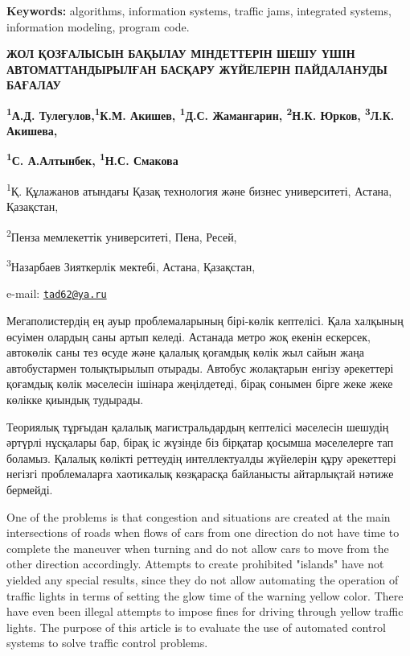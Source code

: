 {\bfseries Keywords:} algorithms, information systems, traffic jams,
integrated systems, information modeling, program code.

\begin{articleheader}
{\bfseries ЖОЛ ҚОЗҒАЛЫСЫН БАҚЫЛАУ МІНДЕТТЕРІН ШЕШУ ҮШІН АВТОМАТТАНДЫРЫЛҒАН
БАСҚАРУ ЖҮЙЕЛЕРІН ПАЙДАЛАНУДЫ БАҒАЛАУ}

{\bfseries \textsuperscript{1}А.Д.
Тулегулов\textsuperscript{\envelope },\textsuperscript{1}К.М. Акишев,
\textsuperscript{1}Д.С. Жамангарин, \textsuperscript{2}Н.К. Юрков,
\textsuperscript{3}Л.К. Акишева,}

{\bfseries \textsuperscript{1}С. А.Алтынбек, \textsuperscript{1}Н.С.
Смакова}
\end{articleheader}

\begin{affiliation}
\textsuperscript{1}Қ. Құлажанов атындағы Қазақ технология және бизнес
университеті, Астана, Қазақстан,

\textsuperscript{2}Пенза мемлекеттік университеті, Пена, Ресей,

\textsuperscript{3}Назарбаев Зияткерлік мектебі, Астана, Қазақстан,

e-mail: \href{mailto:tad62@ya.ru}{\nolinkurl{tad62@ya.ru}}
\end{affiliation}

Мегаполистердің ең ауыр проблемаларының бірі-көлік кептелісі. Қала
халқының өсуімен олардың саны артып келеді. Астанада метро жоқ екенін
ескерсек, автокөлік саны тез өсуде және қалалық қоғамдық көлік жыл сайын
жаңа автобустармен толықтырылып отырады. Автобус жолақтарын енгізу
әрекеттері қоғамдық көлік мәселесін ішінара жеңілдетеді, бірақ сонымен
бірге жеке жеке көлікке қиындық тудырады.

Теориялық тұрғыдан қалалық магистральдардың кептелісі мәселесін шешудің
әртүрлі нұсқалары бар, бірақ іс жүзінде біз бірқатар қосымша мәселелерге
тап боламыз. Қалалық көлікті реттеудің интеллектуалды жүйелерін құру
әрекеттері негізгі проблемаларға хаотикалық көзқарасқа байланысты
айтарлықтай нәтиже бермейді.

One of the problems is that congestion and situations are created at the
main intersections of roads when flows of cars from one direction do not
have time to complete the maneuver when turning and do not allow cars to
move from the other direction accordingly. Attempts to create prohibited
"islands" have not yielded any special results, since they do not allow
automating the operation of traffic lights in terms of setting the glow
time of the warning yellow color. There have even been illegal attempts
to impose fines for driving through yellow traffic lights. The purpose
of this article is to evaluate the use of automated control systems to
solve traffic control problems.

